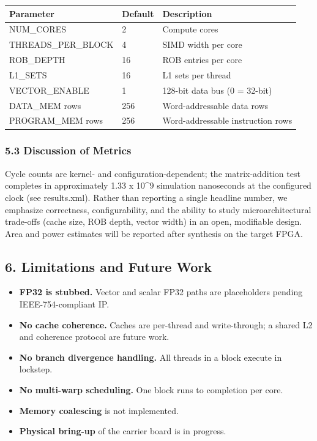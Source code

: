 \begin{longtable}[]{@{}lll@{}}
\toprule\noalign{}
Parameter & Default & Description \\
\midrule\noalign{}
\endhead
\bottomrule\noalign{}
\endlastfoot
NUM\_CORES & 2 & Compute cores \\
THREADS\_PER\_BLOCK & 4 & SIMD width per core \\
ROB\_DEPTH & 16 & ROB entries per core \\
L1\_SETS & 16 & L1 sets per thread \\
VECTOR\_ENABLE & 1 & 128-bit data bus (0 = 32-bit) \\
DATA\_MEM rows & 256 & Word-addressable data rows \\
PROGRAM\_MEM rows & 256 & Word-addressable instruction rows \\
\end{longtable}

\subsubsection{5.3 Discussion of
Metrics}\label{53-discussion-of-metrics}

Cycle counts are kernel- and configuration-dependent; the
matrix-addition test completes in approximately 1.33 x 10\^{}9
simulation nanoseconds at the configured clock (see results.xml). Rather
than reporting a single headline number, we emphasize correctness,
configurability, and the ability to study microarchitectural trade-offs
(cache size, ROB depth, vector width) in an open, modifiable design.
Area and power estimates will be reported after synthesis on the target
FPGA.

\subsection{6. Limitations and Future
Work}\label{6-limitations-and-future-work}

\begin{itemize}
\tightlist
\item
  \textbf{FP32 is stubbed.} Vector and scalar FP32 paths are
  placeholders pending IEEE-754-compliant IP.
\item
  \textbf{No cache coherence.} Caches are per-thread and write-through;
  a shared L2 and coherence protocol are future work.
\item
  \textbf{No branch divergence handling.} All threads in a block execute
  in lockstep.
\item
  \textbf{No multi-warp scheduling.} One block runs to completion per
  core.
\item
  \textbf{Memory coalescing} is not implemented.
\item
  \textbf{Physical bring-up} of the carrier board is in progress.
\end{itemize}

